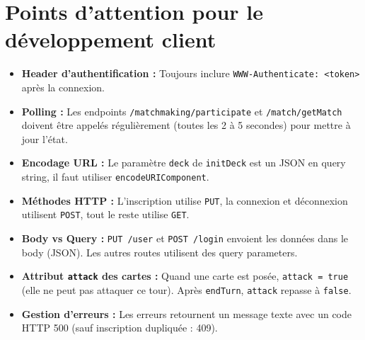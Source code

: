 \documentclass[12pt,a4paper]{article}
\begin{document}
\section{Points d'attention pour le développement client}

\begin{itemize}
    \item \textbf{Header d'authentification :} Toujours inclure \texttt{WWW-Authenticate: <token>} après la connexion.
    \item \textbf{Polling :} Les endpoints \texttt{/matchmaking/participate} et \texttt{/match/getMatch} doivent être appelés régulièrement (toutes les 2 à 5 secondes) pour mettre à jour l'état.
    \item \textbf{Encodage URL :} Le paramètre \texttt{deck} de \texttt{initDeck} est un JSON en query string, il faut utiliser \texttt{encodeURIComponent}.
    \item \textbf{Méthodes HTTP :} L'inscription utilise \texttt{PUT}, la connexion et déconnexion utilisent \texttt{POST}, tout le reste utilise \texttt{GET}.
    \item \textbf{Body vs Query :} \texttt{PUT /user} et \texttt{POST /login} envoient les données dans le body (JSON). Les autres routes utilisent des query parameters.
    \item \textbf{Attribut \texttt{attack} des cartes :} Quand une carte est posée, \texttt{attack = true} (elle ne peut pas attaquer ce tour). Après \texttt{endTurn}, \texttt{attack} repasse à \texttt{false}.
    \item \textbf{Gestion d'erreurs :} Les erreurs retournent un message texte avec un code HTTP 500 (sauf inscription dupliquée : 409).
\end{itemize}
\end{document}
